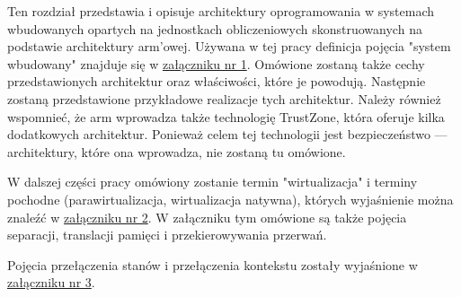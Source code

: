 \documentclass[../../main]{subfiles}
\begin{document}

Ten rozdział przedstawia i opisuje architektury oprogramowania w systemach wbudowanych opartych na jednostkach obliczeniowych skonstruowanych na podstawie architektury \gls{arm}'owej. Używana w tej pracy definicja pojęcia "system wbudowany" znajduje się w \hyperref[sec:zalacznik-1]{załączniku nr 1}. Omówione zostaną także cechy przedstawionych architektur oraz właściwości, które je powodują. Następnie zostaną przedstawione przykładowe realizacje tych architektur. Należy również wspomnieć, że \gls{arm} wprowadza także technologię TrustZone, która oferuje kilka dodatkowych architektur. Ponieważ celem tej technologii jest bezpieczeństwo — architektury, które ona wprowadza, nie zostaną tu omówione.

W dalszej części pracy omówiony zostanie termin "wirtualizacja" i terminy pochodne (parawirtualizacja, wirtualizacja natywna), których wyjaśnienie można znaleźć w  \hyperref[sec:zalacznik-2]{załączniku nr 2}. W załączniku tym omówione są także pojęcia separacji, translacji pamięci i przekierowywania przerwań.

Pojęcia przełączenia stanów i przełączenia kontekstu zostały wyjaśnione w \hyperref[sec:zalacznik-3]{załączniku nr 3}.
\end{document}
